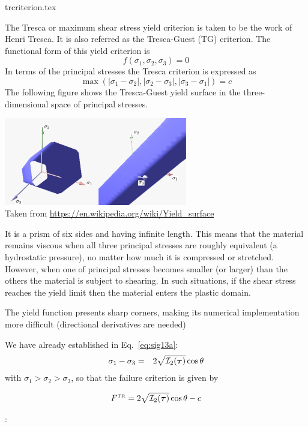 \begin{flushright} {\tiny {\color{gray} trcriterion.tex}} \end{flushright}

The Tresca or maximum shear stress yield criterion is taken to be the work of Henri Tresca. It is also referred as the Tresca-Guest (TG) criterion. The functional form of this yield criterion is
\[
f(\sigma_1,\sigma_2,\sigma_3) = 0
\]
In terms of the principal stresses the Tresca criterion is expressed as
\[
{\max(|\sigma_1 - \sigma_2| , |\sigma_2 - \sigma_3| , |\sigma_3 - \sigma_1| ) = c }
\]
The following figure shows the Tresca-Guest yield surface in the three-dimensional space of principal stresses. 
\begin{center}
\includegraphics[width=0.6\textwidth]{images/rheology/tresca/Tresca.pdf}\\
{\captionfont Taken from \url{https://en.wikipedia.org/wiki/Yield_surface}}
\end{center}
It is a prism of six sides and having infinite length. This means that the 
material remains viscous when all three principal stresses are roughly equivalent 
(a hydrostatic pressure), no matter how much it is compressed or stretched. 
However, when one of principal stresses becomes smaller (or larger) than the others 
the material is subject to shearing. In such situations, if the shear 
stress reaches the yield limit then the material enters the plastic domain. 

\begin{remark}
The yield function presents sharp corners, making its numerical implementation 
more difficult (directional derivatives are needed)
\end{remark}

We have already established in Eq.~\eqref{eq:sig13a}:
\begin{eqnarray}
\sigma_1 - \sigma_3  &=& 2 \sqrt{{\cal I}_2({\bm \tau})} \cos \theta \nonumber
\end{eqnarray}
with $\sigma_1>\sigma_2>\sigma_3$,
so that the failure criterion is given by
\begin{mdframed}[backgroundcolor=blue!5]
\[
F^{\text{\tiny TR}}=2\sqrt{ {\cal I}_2({\bm \tau})  } \cos \theta - c 
\]
\end{mdframed}

\Literature: 




\newpage
